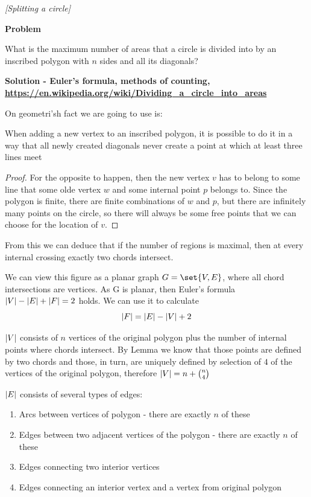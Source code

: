\filbreak

\begin{problem}
\textit{[Splitting a circle]}

\textbf{Problem}

What is the maximum number of areas that a circle is divided into by an inscribed polygon with $n$ sides and all its diagonals?

\textbf{Solution  - Euler's formula, methods of counting, \url{https://en.wikipedia.org/wiki/Dividing_a_circle_into_areas} }

On geometri'sh fact we are going to use is:
\begin{lemma}
When adding a new vertex to an inscribed polygon, it is possible to do it in a way that all newly created diagonals never create a point at which at least three lines meet
\end{lemma}
\begin{proof}
For the opposite to happen, then the new vertex $v$ has to belong to some line that some olde vertex $w$ and some internal point $p$ belongs to. Since the polygon is finite, there are finite combinations of $w$ and $p$, but there are infinitely many points on the circle, so there will always be some free points that we can choose for the location of $v$.
\end{proof}

From this we can deduce that if the number of regions is maximal, then at every internal crossing exactly two chords intersect.

We can view this figure as a planar graph $G=\set{V,E}$, where all chord intersections are vertices. As G is planar, then Euler's formula $\lvert V\rvert-\lvert E\rvert+\lvert F\rvert=2$ holds. We can use it to calculate 
\begin{equation}
\label{euler}
\lvert F\rvert=\lvert E\rvert-\lvert V\rvert + 2
\end{equation}

$\lvert V\rvert$ consists of $n$ vertices of the original polygon plus the number of internal points where chords intersect. By Lemma we know that those points are defined by two chords and those, in turn, are uniquely defined by selection of $4$ of the vertices of the original polygon, therefore $\lvert V\rvert=n+\binom{n}{4}$

$\lvert E\rvert$ consists of several types of edges:
\begin{enumerate}
\item Arcs between vertices of polygon - there are exactly $n$ of these
\item Edges between two adjacent vertices of the polygon - there are exactly $n$ of these
\item \label{interior} Edges connecting two interior vertices
\item \label{interiorexterior} Edges connecting an interior vertex and a vertex from original polygon


\end{enumerate}
\end{problem}
